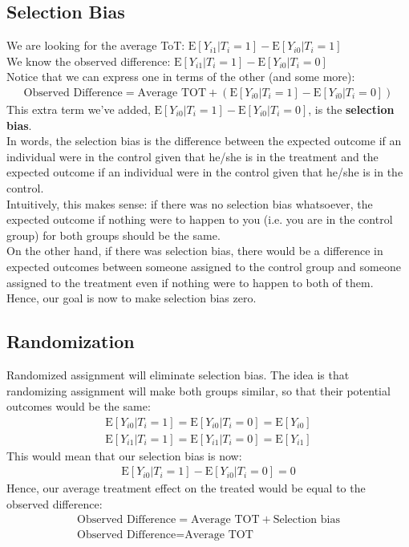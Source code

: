 \documentclass{article}
\begin{document}
\subsection{Selection Bias}
We are looking for the average ToT: $\text{E}[Y_{i1} | T_i = 1] - \text{E}[Y_{i0} | T_i = 1]$\\
We know the observed difference: $\text{E}[Y_{i1}|T_i = 1] - \text{E}[Y_{i0}|T_i = 0]$
\\
Notice that we can express one in terms of the other (and some more): 
\begin{gather*}
    \text{Observed Difference} = \text{Average TOT} + (\text{E}[Y_{i0} | T_i = 1] - \text{E}[Y_{i0}|T_i = 0])
\end{gather*}
This extra term we've added, $\text{E}[Y_{i0} | T_i = 1] - \text{E}[Y_{i0}|T_i = 0]$, is the \textbf{selection bias}.
\\
In words, the selection bias is the difference between the expected outcome if an individual were in the control given that he/she is in the treatment and the expected outcome if an individual were in the control given that he/she is in the control.
\\
Intuitively, this makes sense: if there was no selection bias whatsoever, the expected outcome if nothing were to happen to you (i.e. you are in the control group) for both groups should be the same. 
\\
On the other hand, if there was selection bias, there would be a difference in expected outcomes between someone assigned to the control group and someone assigned to the treatment even if nothing were to happen to both of them.
\\
Hence, our goal is now to make selection bias zero.

\subsection{Randomization}
Randomized assignment will eliminate selection bias. 
The idea is that randomizing assignment will make both groups similar, so that their potential outcomes would be the same:
\begin{gather*}
    \text{E}[Y_{i0}|T_i = 1] = \text{E}[Y_{i0}|T_i = 0] = \text{E}[Y_{i0}]\\
    \text{E}[Y_{i1}|T_i = 1] = \text{E}[Y_{i1}|T_i = 0] = \text{E}[Y_{i1}]
\end{gather*}
This would mean that our selection bias is now:
\begin{gather*}
    \text{E}[Y_{i0} | T_i = 1] - \text{E}[Y_{i0}|T_i = 0] = 0
\end{gather*}
Hence, our average treatment effect on the treated would be equal to the observed difference:
\begin{gather*}
    \text{Observed Difference} = \text{Average TOT} + \text{Selection bias}\\
    \text{Observed Difference} = \text{Average TOT}
\end{gather*}
\end{document}
